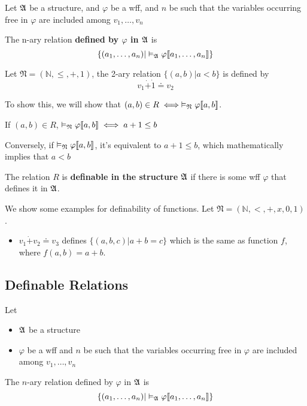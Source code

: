 \begin{definition}
    Let $\mathfrak{A}$ be a structure, and $\varphi$ be a wff, and $n$ be such that the variables occurring free in $\varphi$ are included among $v_1,\dots,v_n$

    The n-ary relation \textbf{defined by $\varphi$ in $\mathfrak{A}$} is
    \[ \{ (a_1,\dots,a_n) | \vDash_{\mathfrak{A}}\varphi\llbracket a_1,\dots,a_n \rrbracket\} \]
\end{definition}

Let $\mathfrak{N} = (\mathbb{N},\le, +, 1)$, the 2-ary relation $\{(a,b)|a < b\}$ is defined by
\[ v_1 \dot{+}\dot{1}\doteq v_2 \]

To show this, we will show that $(a,b) \in R \iff \vDash_{\mathfrak{N}}\varphi\llbracket a,b \rrbracket$.

If $(a,b) \in R$, $\vDash_{\mathfrak{N}}\varphi\llbracket a,b \rrbracket \iff a+1 \le b$

Conversely, if $\vDash_{\mathfrak{N}}\varphi\llbracket a,b \rrbracket$, it's equivalent to $a+1 \le b$, which mathematically implies that $a < b$

\begin{definition}[Definability]
    The relation $R$ is \textbf{definable in the structure $\mathfrak{A}$} if there is some wff $\varphi$ that defines it in $\mathfrak{A}$.
\end{definition}

We show some examples for definability of functions. Let $\mathfrak{N} = (\mathbb{N}, <, +, x, 0, 1)$.

\begin{itemize}
    \item $v_1 \dot{+} v_2 \doteq v_3$ defines $\{ (a,b,c) | a + b = c\}$ which is the same as function $f$, where $f(a,b) = a + b$.
\end{itemize}

\subsection{Definable Relations}

\begin{definition}
    Let
    \begin{itemize}
        \item $\mathfrak{A}$ be a structure
        \item $\varphi$ be a wff and $n$ be such that the variables occurring free in $\varphi$ are included among $v_1,\dots,v_n$
    \end{itemize}

    The $n$-ary relation defined by $\varphi$ in $\mathfrak{A}$ is
    \[ \{ (a_1,\dots,a_n) | \vDash_{\mathfrak{A}}\varphi\llbracket a_1,\dots,a_n \rrbracket \} \]
\end{definition}

